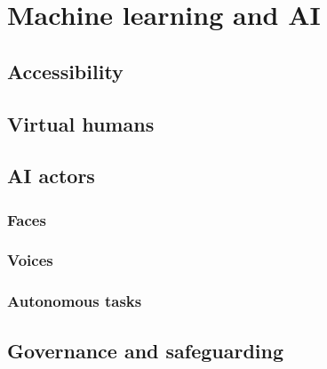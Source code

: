 \section{Machine learning and AI}
\subsection{Accessibility}
\subsection{Virtual humans}
\subsection{AI actors}
\subsubsection{Faces}
\subsubsection{Voices}
\subsubsection{Autonomous tasks}
\subsection{Governance and safeguarding}

